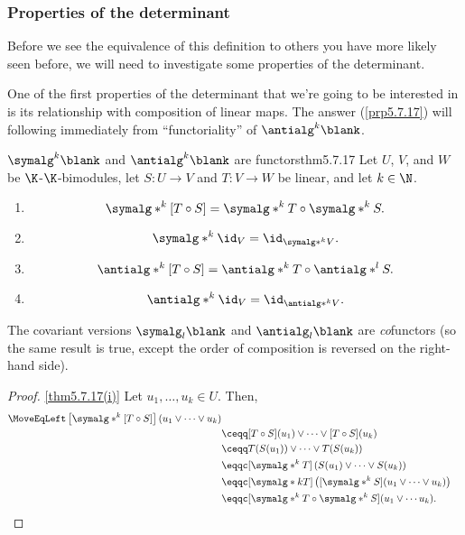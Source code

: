 \subsubsection{Properties of the determinant}

Before we see the equivalence of this definition to others you have more likely seen before, we will need to investigate some properties of the determinant.

One of the first properties of the determinant that we're going to be interested in is its relationship with composition of linear maps.  The answer (\cref{prp5.7.17}) will following immediately from ``functoriality'' of $\antialg ^k\blank$.
\begin{thm}{$\symalg ^k\blank$ and $\antialg ^k\blank$ are functors}{thm5.7.17}
	Let $U$, $V$, and $W$ be $\K$-$\K$-bimodules, let $S\colon U\rightarrow V$ and $T\colon V\rightarrow W$ be linear, and let $k\in \N$.
	\begin{enumerate}
		\item \label{thm5.7.17(i)}
		\begin{equation}
		\symalg* ^k[T\circ S]=\symalg* ^kT\circ \symalg* ^kS.
		\end{equation}
		\item \label{thm5.7.17(ii)}
		\begin{equation}
		\symalg* ^k\id _V=\id _{\symalg* ^kV}.
		\end{equation}
		\item \label{thm5.7.17(iii)}
		\begin{equation}
		\antialg* ^k[T\circ S]=\antialg* ^kT\circ \antialg* ^lS.
		\end{equation}
		\item \label{thm5.7.17(iv)}
		\begin{equation}
		\antialg* ^k\id _V=\id _{\antialg* ^kV}.
		\end{equation}
	\end{enumerate}
	\begin{rmk}
		The covariant versions $\symalg _l\blank$ and $\antialg _l\blank$ are \emph{co}functors (so the same result is true, except the order of composition is reversed on the right-hand side).
	\end{rmk}
	\begin{proof}
		\cref{thm5.7.17(i)} Let $u_1,\ldots ,u_k\in U$.  Then,
		\begin{equation}
			\begin{split}
			\MoveEqLeft
			\left[ \symalg* ^k[T\circ S]\right] (u_1\vee \cdots \vee u_k) \\
			& \ceqq [T\circ S](u_1)\vee \cdots \vee [T\circ S](u_k) \\
			& \ceqq T(S(u_1))\vee \cdots \vee T(S(u_k)) \\
			& \eqqc [\symalg* ^kT]\left( S(u_1)\vee \cdots \vee S(u_k)\right) \\
			& \eqqc [\symalg* kT]\left( [\symalg* ^kS](u_1\vee \cdots \vee u_k)\right) \\
			& \eqqc [\symalg* ^kT\circ \symalg* ^kS](u_1\vee \cdots u_k).
			\end{split}
		\end{equation}
		

\end{proof}
\end{thm}
